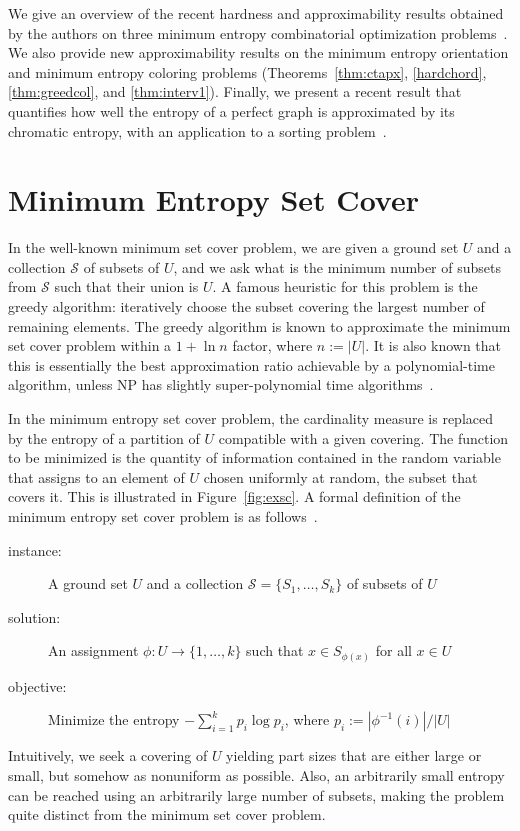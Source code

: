\documentclass[10pt,a4paper]{article}
\begin{document}
We give an overview of the recent hardness and approximability results 
obtained by the authors on three minimum entropy combinatorial optimization problems~\cite{CFJ07,CFJ08b,CFJ08a}. We also provide new approximability results on the minimum entropy orientation and minimum entropy coloring problems (Theorems~\ref{thm:ctapx}, \ref{hardchord}, \ref{thm:greedcol}, and \ref{thm:interv1}). Finally, we present a recent result that quantifies how well the entropy of a perfect graph is approximated by its chromatic entropy, with an application to a sorting problem~\cite{POP_SICOMP}.

\section{Minimum Entropy Set Cover}

In the well-known minimum set cover problem, we are given a ground set $U$ and a collection $\mathcal{S}$ of subsets of $U$, and we ask what is the minimum number of subsets from $\mathcal{S}$ such that their union is $U$. A famous heuristic for this problem is the greedy algorithm: iteratively choose the subset covering the largest number of remaining elements. The greedy algorithm is known to approximate the minimum set cover problem within a $1 + \ln n$ factor, where $n := |U|$. It is also known that this is essentially the best approximation ratio achievable by a polynomial-time algorithm, unless NP has slightly super-polynomial time algorithms~\cite{F98}.\medskip

In the minimum entropy set cover problem, the cardinality measure is replaced by the entropy of a partition of $U$ compatible with a given covering. The function to be minimized is the quantity of information contained in the random variable that assigns to an element of $U$ chosen uniformly at random, the subset that covers it. This is illustrated in Figure~\ref{fig:exsc}.
A formal definition of the minimum entropy set cover problem is as follows~\cite{HK05,CFJ08a}.
\begin{description}
\item[\sc instance:] A ground set $U$ and a collection $\mathcal{S} = \{S_1,\ldots,S_k\}$ of subsets of $U$
\item[\sc solution:] An assignment $\phi : U \to \{1,\ldots,k\}$ such that $x \in S_{\phi(x)}$ for all $x \in U$
\item[\sc objective:] Minimize the entropy $- \sum_{i=1}^k p_i \log p_i$, where $p_i := |\phi^{-1}(i)| / |U|$
\end{description}
Intuitively, we seek a covering of $U$ yielding part sizes that are either large or small, but somehow as nonuniform as possible. Also, an arbitrarily small entropy can be reached using an arbitrarily large number of subsets, making the problem quite distinct from the minimum set cover problem.
\end{document}
